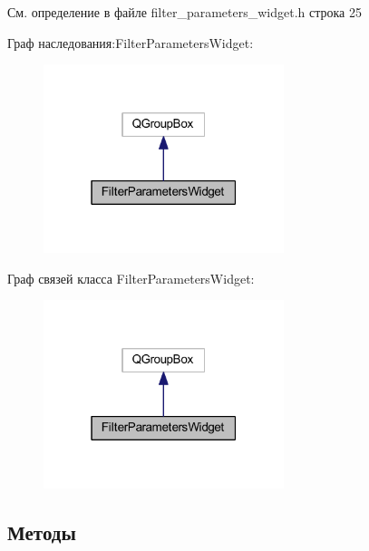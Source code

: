 См. определение в файле filter\+\_\+parameters\+\_\+widget.\+h строка 25



Граф наследования\+:Filter\+Parameters\+Widget\+:
\nopagebreak
\begin{figure}[H]
\begin{center}
\leavevmode
\includegraphics[width=199pt]{class_filter_parameters_widget__inherit__graph}
\end{center}
\end{figure}


Граф связей класса Filter\+Parameters\+Widget\+:
\nopagebreak
\begin{figure}[H]
\begin{center}
\leavevmode
\includegraphics[width=199pt]{class_filter_parameters_widget__coll__graph}
\end{center}
\end{figure}


\subsection{Методы}
\hypertarget{class_filter_parameters_widget_aac02d00c8d38c893f046e160765ded10}{}\label{class_filter_parameters_widget_aac02d00c8d38c893f046e160765ded10} 

